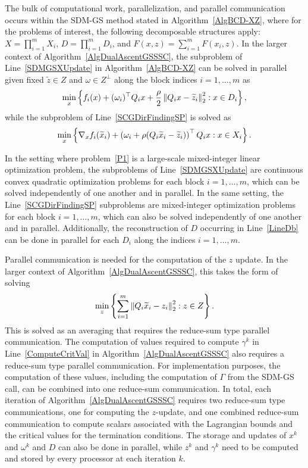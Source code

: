 The bulk of computational work, parallelization, and parallel communication occurs within the SDM-GS method stated in Algorithm~\ref{AlgBCD-XZ}, where for the problems of interest, the following decomposable structures apply: $X=\prod_{i=1}^m X_i$, $D=\prod_{i=1}^m D_i$,  and $F(x,z)=\sum_{i=1}^m F(x_i,z)$. 
In the larger context of Algorithm~\ref{AlgDualAscentGSSSC}, the subproblem of Line~\ref{SDMGSXUpdate} in Algorithm~\ref{AlgBCD-XZ} can be solved in parallel given fixed $\widetilde{z} \in Z$ and $\omega \in Z^\perp$ along the block indices $i=1,\dots,m$ as
\begin{equation}\label{Alg4QMP}
\min_{x} \left\{  f_i(x) + (\omega_i)^\top Q_i x + \frac{\rho}{2} \left \| Q_i x - \widetilde{z}_i \right \|_2^2 : x \in D_i \right \},
\end{equation}
while the subproblem of Line~\ref{SCGDirFindingSP} is solved as
$$
\min_x \left\{  \nabla_x f_i(\widetilde{x}_i) + \left( \omega_i + \rho(Q_i \widetilde{x}_i - \widetilde{z}_i) \right)^\top Q_i x : x \in X_i \right \}.
$$
\begin{remark}
In the setting where problem~\eqref{P1} is a large-scale mixed-integer linear optimization problem, the subproblems of Line~\ref{SDMGSXUpdate} are continuous convex quadratic optimization problems for each block $i=1,\dots,m$, which can be solved independently of one another and in parallel. In the same setting, the Line~\ref{SCGDirFindingSP} subproblems are mixed-integer optimization problems for each block $i=1,\dots,m$, which can also be solved independently of one another and in parallel.
Additionally, the reconstruction of $D$ occurring in Line~\ref{LineDb} can be done in parallel for each $D_i$ along the indices $i=1,\dots,m$.
\end{remark}


Parallel communication is needed for the computation of the $z$ update. In the larger context of Algorithm~\ref{AlgDualAscentGSSSC}, this takes the form of solving
$$
\min_z \left\{ \sum_{i=1}^m \left \| Q_i \widetilde{x}_i - z_i \right \|_2^2 : z \in Z \right \}.
$$
This is solved as an averaging that requires the reduce-sum type parallel communication.
The computation of values required to compute $\gamma^k$ in Line~\ref{ComputeCritVal} in Algorithm~\ref{AlgDualAscentGSSSC} also requires a reduce-sum type parallel communication. 
For implementation purposes, the computation of these values, including the computation of $\Gamma$ from the SDM-GS call, can be combined into one reduce-sum communication. In total, each iteration of Algorithm~\ref{AlgDualAscentGSSSC} requires two reduce-sum type communications, one for computing the $z$-update, and one combined reduce-sum communication to compute scalars associated with the Lagrangian bounds and the critical values for the termination conditions. 
The storage and updates of $x^k$ and $\omega^k$ and $D$ can also be done in parallel, while $z^k$ and $\gamma^k$ need to be computed and stored by every processor at each iteration $k$.

